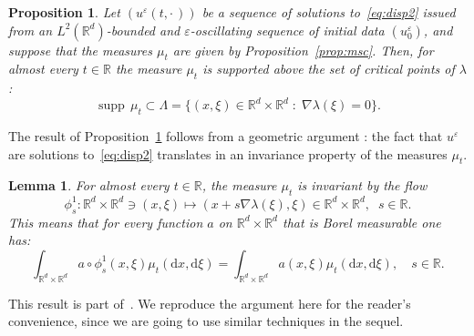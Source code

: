 \documentclass[10pt]{amsart}
\newtheorem{prop}[cdrthm]{Proposition}
\newtheorem{lemm}[cdrthm]{Lemma}
\theoremstyle{definition}
\DeclareMathOperator{\supp}{supp}
\newcommand*\R{{\mathbb R}}
\newcommand*\eps{\varepsilon}
\numberwithin{equation}{section}
\newcommand*{\dd}{\mathrm{d}}
\newcommand*{\dx}{\dd x}
\newcommand*{\dxi}{\dd \xi}
\begin{document}
\begin{prop}\label{prop:loc}
Let $(u^{\eps}(t,\cdot\,))$ be a sequence of solutions to~\eqref{eq:disp2} issued from an $L^2(\R^d)$-bounded and $\eps$-oscillating sequence of initial data $(u^\eps_0)$, and suppose that the measures $\mu_t$ are given by Proposition~\ref{prop:msc}. Then, for almost every $t\in\R$ the measure $\mu_t$ is supported above the set of critical points of $ \lambda$:
\[
{\supp}\, \mu_t\subset\Lambda=\{ (x,\xi) \in \R^d\times\R^d \; : \; \nabla \lambda(\xi)=0\}.
\]
\end{prop}




The result of Proposition~\ref{prop:loc} follows from a geometric argument : the fact that $u^\eps$ are solutions to~\eqref{eq:disp2} translates in an invariance property of the measures $\mu_t$.

\begin{lemm}\label{lemma:inv1}
For almost every $t\in\R$, the measure $\mu_t$ is invariant by the flow
\[
\phi^1_s : \R^d\times\R^d\ni(x,\xi)\longmapsto (x+s\nabla \lambda(\xi),\xi)\in\R^d\times\R^d,\;\;s\in\R.
\]
This means that for every function $a$ on $\R^d\times\R^d$ that is Borel measurable one has:
\[
\int_{\R^d\times\R^d}a\circ\phi^1_s(x,\xi)\mu_t(\dx,\dxi)=\int_{\R^d\times\R^d}a(x,\xi)\mu_t(\dx,\dxi), \quad s\in\R.
\]
\end{lemm}

This result is part of~\cite[Theorem~2]{MaciaAv}. We reproduce the argument here for the reader's convenience, since we are going to use similar techniques in the sequel.
\end{document}
